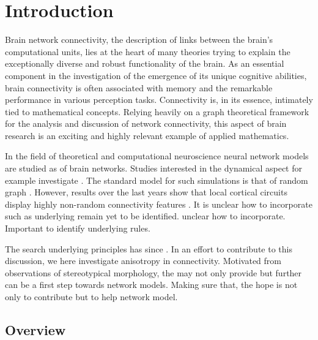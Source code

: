 \chapter{Introduction}\label{ch:Introduction} 

Brain network connectivity, the description of links between the
brain's computational units, lies at the heart of many theories trying
to explain the exceptionally diverse and robust functionality of the
brain. As an essential component in the investigation of the emergence
of its unique cognitive abilities, brain connectivity is often
associated with memory and the remarkable performance in various
perception tasks. Connectivity is, in its essence, intimately tied to
mathematical concepts. Relying heavily on a graph theoretical
framework for the analysis and discussion of network connectivity,
this aspect of brain research is an exciting and highly relevant
example of applied mathematics.

In the field of theoretical and computational neuroscience neural
network models are studied as of brain networks. Studies interested in
the dynamical aspect for example investigate . The standard model for
such simulations is that of random
graph \parencite{Brunel2000}. However, results over the last years
show that local cortical circuits display highly non-random
connectivity features \parencite{Song2005, Perin2011}. It is unclear
how to incorporate such as underlying remain yet to be identified.
unclear how to incorporate. Important to identify underlying rules.

The search underlying principles has
since \parencite{Klinshov2014}. In an effort to contribute to this
discussion, we here investigate anisotropy in connectivity. Motivated
from observations of stereotypical morphology, the may not only
provide but further can be a first step towards network models. Making
sure that, the hope is not only to contribute but to help network
model.


\section{Overview}\label{sec:all_overview}

